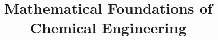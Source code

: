 \documentclass{mitqualif}
\title{Mathematical Foundations of Chemical Engineering}
\begin{document}
\mytitlepage 
\newpage
\tableofcontents
\newpage


\printindex
\end{document}
